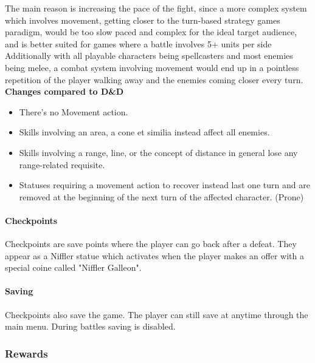 The main reason is increasing the pace of the fight, since a more complex system which involves movement, getting closer to the turn-based strategy games paradigm, would be too slow paced and complex for the ideal target audience, and is better suited for games where a battle involves 5+ units per side Additionally with all playable characters being spellcasters and most enemies being melee, a combat system involving movement would end up in a pointless repetition of the player walking away and the enemies coming closer every turn. \\

\textbf{Changes compared to D\&D}
\begin{itemize}
	\item There's no Movement action.
	\item Skills involving an area, a cone et similia instead affect all enemies.
	\item Skills involving a range, line, or the concept of distance in general lose any range-related requisite.
	\item Statuses requiring a movement action to recover instead last one turn and are removed at the beginning of the next turn of the affected character. (Prone)
\end{itemize}

\pagebreak

\paragraph{Checkpoints}

Checkpoints are save points where the player can go back after a defeat. They appear as a Niffler statue which activates when the player makes an offer with a special coine called "Niffler Galleon".

\paragraph{Saving}

Checkpoints also save the game. The player can still save at anytime through the main menu. During battles saving is disabled.

\subsubsection{Rewards}

